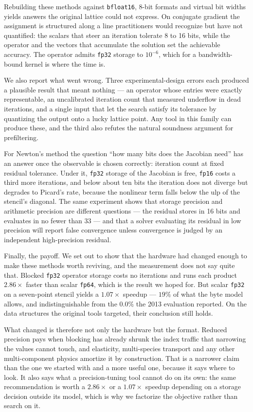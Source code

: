 \documentclass[11pt]{article}
\begin{document}
Rebuilding these methods against \texttt{bfloat16}, 8-bit formats and virtual bit
widths yields answers the original lattice could not express. On conjugate
gradient the assignment is structured along a line practitioners would recognize
but have not quantified: the scalars that steer an iteration tolerate 8 to 16
bits, while the operator and the vectors that accumulate the solution set the
achievable accuracy. The operator admits \texttt{fp32} storage to $10^{-6}$,
which for a bandwidth-bound kernel is where the time is.

We also report what went wrong. Three experimental-design errors each produced a
plausible result that meant nothing --- an operator whose entries were exactly
representable, an uncalibrated iteration count that measured underflow in dead
iterations, and a single input that let the search satisfy its tolerance by
quantizing the output onto a lucky lattice point. Any tool in this family can
produce these, and the third also refutes the natural soundness argument for
prefiltering.

For Newton's method the question ``how many bits does the Jacobian need'' has an
answer once the observable is chosen correctly: iteration count at fixed
residual tolerance. Under it, \texttt{fp32} storage of the Jacobian is free,
\texttt{fp16} costs a third more iterations, and below about ten bits the
iteration does not diverge but degrades to Picard's rate, because the nonlinear
term falls below the ulp of the stencil's diagonal. The same experiment shows
that storage precision and arithmetic precision are different questions --- the
residual stores in 16 bits and evaluates in no fewer than 33 --- and that a
solver evaluating its residual in low precision will report false convergence
unless convergence is judged by an independent high-precision residual.

Finally, the payoff. We set out to show that the hardware had changed enough to
make these methods worth reviving, and the measurement does not say quite that.
Blocked \texttt{fp32} operator storage costs no iterations and runs each product
$2.86\times$ faster than scalar \texttt{fp64}, which is the result we hoped for.
But scalar \texttt{fp32} on a seven-point stencil yields a $1.07\times$ speedup
--- $19\%$ of what
the byte model allows, and indistinguishable from the $0.0\%$ the 2013 evaluation
reported. On the data structures the original tools targeted, their conclusion
still holds.

What changed is therefore not only the hardware but the format. Reduced precision
pays when blocking has already shrunk the index traffic that narrowing the
values cannot touch, and elasticity, multi-species transport and any other
multi-component
physics amortize it by construction. That is a narrower claim than the one we
started with and a more useful one, because it says where to look. It also says
what a precision-tuning tool cannot do on its own: the same recommendation is
worth a $2.86\times$ or a $1.07\times$ speedup depending on a storage decision
outside its model, which is why we factorize the objective rather than search on it.
\end{document}
